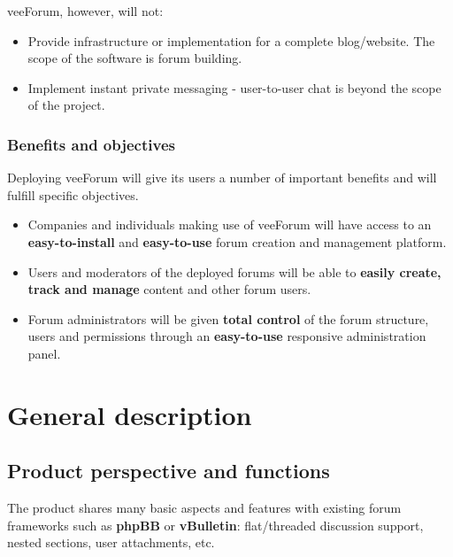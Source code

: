\documentclass[12pt]{report}
\renewcommand\emph{\textbf}
\begin{document}
                        veeForum, however, will not:

                        \begin{itemize}
                            \item Provide infrastructure or implementation for a complete blog/website. The scope of the software is forum building.
                            \item Implement instant private messaging - user-to-user chat is beyond the scope of the project.
                        \end{itemize}

                    \subsubsection{Benefits and objectives}

                        Deploying veeForum will give its users a number of important benefits and will fulfill specific objectives.

                        \begin{itemize}
                            \item Companies and individuals making use of veeForum will have access to an \emph{easy-to-install} and \emph{easy-to-use} forum creation and management platform.
                            \item Users and moderators of the deployed forums will be able to \emph{easily create, track and manage} content and other forum users.
                            \item Forum administrators will be given \emph{total control} of the forum structure, users and permissions through an \emph{easy-to-use} responsive administration panel.
                        \end{itemize}
            
            \section{General description}                            
                \subsection{Product perspective and functions}
                    The product shares many basic aspects and features with existing forum frameworks such as \emph{phpBB} or \emph{vBulletin}: flat/threaded discussion support, nested sections, user attachments, etc.
\end{document}
